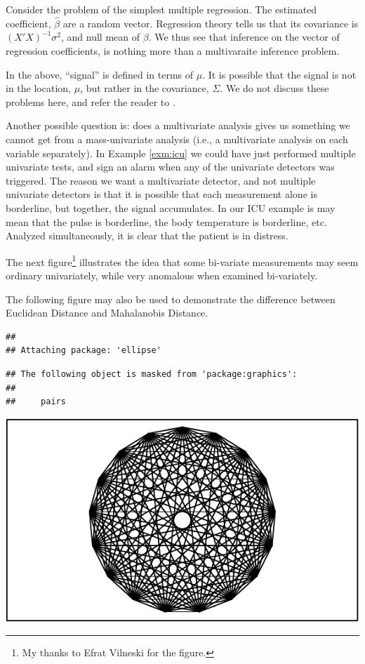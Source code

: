 \documentclass[]{book}
\theoremstyle{definition}
\theoremstyle{definition}
\theoremstyle{definition}
\theoremstyle{remark}
\let\BeginKnitrBlock\begin \let\EndKnitrBlock\end
\begin{document}
\BeginKnitrBlock{example}
\protect\hypertarget{exm:regression}{}{\label{exm:regression} }Consider the problem of the simplest multiple regression.
The estimated coefficient, \(\hat \beta\) are a random vector.
Regression theory tells us that its covariance is \((X'X)^{-1}\sigma^2\), and null mean of \(\beta\).
We thus see that inference on the vector of regression coefficients, is nothing more than a multivaraite inference problem.
\EndKnitrBlock{example}

\BeginKnitrBlock{remark}
{}In the above, ``signal'' is defined in terms of \(\mu\).
It is possible that the signal is not in the location, \(\mu\), but rather in the covariance, \(\Sigma\).
We do not discuss these problems here, and refer the reader to \citet{nadler2008finite}.
\EndKnitrBlock{remark}

Another possible question is: does a multivariate analysis gives us something we cannot get from a mass-univariate analysis (i.e., a multivariate analysis on each variable separately).
In Example \ref{exm:icu} we could have just performed multiple univariate tests, and sign an alarm when any of the univariate detectors was triggered.
The reason we want a multivariate detector, and not multiple univariate detectors is that it is possible that each measurement alone is borderline, but together, the signal accumulates.
In our ICU example is may mean that the pulse is borderline, the body temperature is borderline, etc. Analyzed simultaneously, it is clear that the patient is in distress.

The next figure\footnote{My thanks to Efrat Vilneski for the figure.} illustrates the idea that some bi-variate measurements may seem ordinary univariately, while very anomalous when examined bi-variately.

\BeginKnitrBlock{remark}
{}The following figure may also be used to demonstrate the difference between Euclidean Distance and Mahalanobis Distance.
\EndKnitrBlock{remark}

\begin{verbatim}
## 
## Attaching package: 'ellipse'
\end{verbatim}

\begin{verbatim}
## The following object is masked from 'package:graphics':
## 
##     pairs
\end{verbatim}

\includegraphics[width=0.5\linewidth]{Rcourse_files/figure-latex/unnamed-chunk-221-1}
\end{document}
